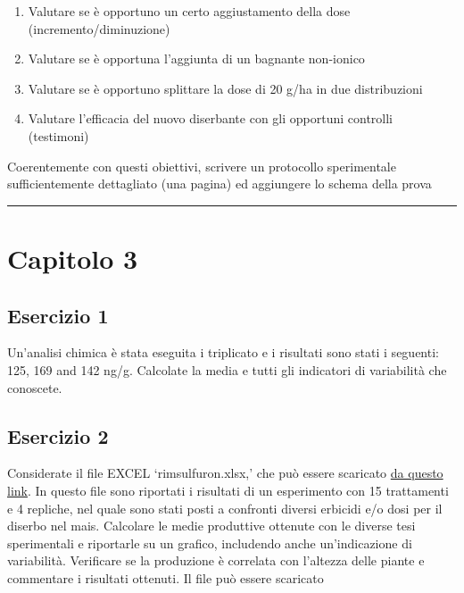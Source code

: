 \documentclass[a4paper,12pt,oneside]{book}
\providecommand{\tightlist}{%
  \setlength{\itemsep}{0pt}\setlength{\parskip}{0pt}}
\begin{document}
\begin{enumerate}
\def\labelenumi{\arabic{enumi}.}
\tightlist
\item
  Valutare se è opportuno un certo aggiustamento della dose (incremento/diminuzione)
\item
  Valutare se è opportuna l'aggiunta di un bagnante non-ionico
\item
  Valutare se è opportuno splittare la dose di 20 g/ha in due distribuzioni
\item
  Valutare l'efficacia del nuovo diserbante con gli opportuni controlli (testimoni)
\end{enumerate}

Coerentemente con questi obiettivi, scrivere un protocollo sperimentale sufficientemente dettagliato (una pagina) ed aggiungere lo schema della prova

\begin{center}\rule{0.5\linewidth}{0.5pt}\end{center}

\hypertarget{capitolo-3}{%
\section{Capitolo 3}\label{capitolo-3}}

\hypertarget{esercizio-1-1}{%
\subsection{Esercizio 1}\label{esercizio-1-1}}

Un'analisi chimica è stata eseguita i triplicato e i risultati sono stati i seguenti: 125, 169 and 142 ng/g. Calcolate la media e tutti gli indicatori di variabilità che conoscete.

\hypertarget{esercizio-2}{%
\subsection{Esercizio 2}\label{esercizio-2}}

Considerate il file EXCEL `rimsulfuron.xlsx,' che può essere scaricato \href{https://www.casaonofri.it/_datasets/rimsulfuron.xlsx}{da questo link}. In questo file sono riportati i risultati di un esperimento con 15 trattamenti e 4 repliche, nel quale sono stati posti a confronti diversi erbicidi e/o dosi per il diserbo nel mais. Calcolare le medie produttive ottenute con le diverse tesi sperimentali e riportarle su un grafico, includendo anche un'indicazione di variabilità. Verificare se la produzione è correlata con l'altezza delle piante e commentare i risultati ottenuti. Il file può essere scaricato
\end{document}
